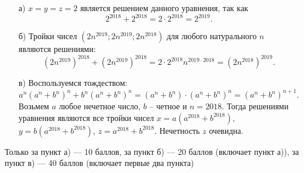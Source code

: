 \solutionSection
\begin{enumerate}    
   \item [а)] $x=y=z=2$ является решением данного уравнения, так как $$2^{2018}+2^{2018}=2\cdot2^{2018}=2^{2019}.$$

   \item [б)]  Тройки чисел $(2n^{2019};2n^{2019};2n^{2018})$ для любого натурального $n$ являются решениями: $$(2n^{2019})^{2018}+(2n^{2019})^{2018}=2\cdot2^{2018}n^{2019\cdot2018}=(2n^{2018})^{2019}.$$

   \item [в)] Воспользуемся тождеством: 
    $$
    a^n(a^n+b^n)^n+b^n(a^n+b^n)^n=(a^n+b^n)\cdot(a^n+b^n)^n=(a^n+b^n)^{n+1}.
    $$
    Возьмем $a$ любое нечетное число, $b$ -- четное и $n=2018$. Тогда решениями уравнения являются все тройки чисел $x=a(a^{2018}+b^{2018}),$ $y=b(a^{2018}+b^{2018})$, $z=a^{2018}+b^{2018}.$ Нечетность $z$ очевидна.
\end{enumerate}

\additionalCriteria
Только за пункт а) --- 10 баллов, за пункт б) --- 20 баллов (включает пункт а)), за пункт в) --- 40 баллов (включает первые два пункта)
